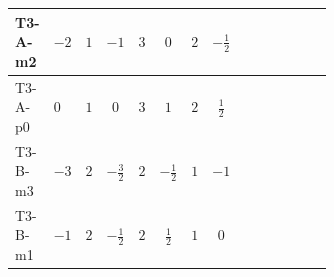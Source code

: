 \documentclass[8pt]{article}
\begin{document}
\begin{landscape}
\begin{longtable}{@{}llcccccc >{\raggedright\arraybackslash}p{0.21\linewidth} >{\raggedright\arraybackslash}p{0.21\linewidth} >{\raggedright\arraybackslash}p{0.21\linewidth}@{}}
\midrule
T3-A-m2 & $-2$ & $1$ & $-1$ & $3$ & $0$ & $2$ & $-\frac{1}{2}$ & \scriptsize\adjustbox{max width=\linewidth}{$\begin{gathered} +4 {\lambda_{12}^{(1)}}^2\end{gathered}$} & \scriptsize\adjustbox{max width=\linewidth}{$\begin{gathered} +4 {\lambda_{12}^{(1)}} {\lambda_{S_1}^{(1)}}\end{gathered}$} & \scriptsize\adjustbox{max width=\linewidth}{$\begin{gathered} +8 {\lambda_{12}^{(1)}} {\lambda_{S_2}^{(1)}}\end{gathered}$} \\
\midrule
T3-A-p0 & $0$ & $1$ & $0$ & $3$ & $1$ & $2$ & $\frac{1}{2}$ & \scriptsize\adjustbox{max width=\linewidth}{$\begin{gathered} +4 {\lambda_{12}^{(1)}}^2\end{gathered}$} & \scriptsize\adjustbox{max width=\linewidth}{$\begin{gathered} +4 {\lambda_{12}^{(1)}} {\lambda_{S_1}^{(1)}}\end{gathered}$} & \scriptsize\adjustbox{max width=\linewidth}{$\begin{gathered} +8 {\lambda_{12}^{(1)}} {\lambda_{S_2}^{(1)}}\end{gathered}$} \\
\midrule
T3-B-m3 & $-3$ & $2$ & $-\frac{3}{2}$ & $2$ & $-\frac{1}{2}$ & $1$ & $-1$ & \scriptsize\adjustbox{max width=\linewidth}{$\begin{gathered} +4 {\lambda_{12}^{(1)}}^2\end{gathered}$} & \scriptsize\adjustbox{max width=\linewidth}{$\begin{gathered} +6 {\lambda_{12}^{(1)}} {\lambda_{S_1}^{(1)}}\end{gathered}$} & \scriptsize\adjustbox{max width=\linewidth}{$\begin{gathered} +6 {\lambda_{12}^{(1)}} {\lambda_{S_2}^{(1)}}\end{gathered}$} \\
\midrule
T3-B-m1 & $-1$ & $2$ & $-\frac{1}{2}$ & $2$ & $\frac{1}{2}$ & $1$ & $0$ & \scriptsize\adjustbox{max width=\linewidth}{$\begin{gathered} +4 {\lambda_{12}^{(1)}}^2\end{gathered}$} & \scriptsize\adjustbox{max width=\linewidth}{$\begin{gathered} +6 {\lambda_{12}^{(1)}} {\lambda_{S_1}^{(1)}}\end{gathered}$} & \scriptsize\adjustbox{max width=\linewidth}{$\begin{gathered} +6 {\lambda_{12}^{(1)}} {\lambda_{S_2}^{(1)}}\end{gathered}$} \\

\end{longtable}
\end{landscape}
\end{document}
